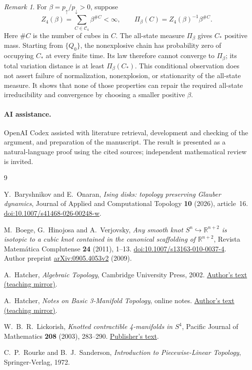 \documentclass[11pt]{article}
\theoremstyle{remark}
\newtheorem{remark}[theorem]{Remark}
\newcommand{\Cl}{\mathcal C}
\newcommand{\R}{\mathbb R}
\begin{document}
\begin{remark}\label{rem:law}
For $\beta=p_\uparrow/p_\downarrow>0$, suppose
\[
 Z_4(\beta)=\sum_{C\in\Cl_4}\beta^{\#C}<\infty,
 \qquad \Pi_\beta(C)=Z_4(\beta)^{-1}\beta^{\#C}.
\]
Here $\#C$ is the number of cubes in $C$. The all-state measure
$\Pi_\beta$ gives $C_*$ positive mass. Starting from $\{Q_0\}$, the
nonexplosive chain has probability zero of occupying $C_*$ at every
finite time. Its law therefore cannot converge to $\Pi_\beta$; its
total variation distance is at least $\Pi_\beta(C_*)$.
This conditional observation does not assert failure of normalization,
nonexplosion, or stationarity of the all-state measure. It shows that
none of those properties can repair the required all-state irreducibility
and convergence by choosing a smaller positive $\beta$.
\end{remark}

\paragraph{AI assistance.}
OpenAI Codex assisted with literature retrieval, development and checking
of the argument, and preparation of the manuscript. The result is
presented as a natural-language proof using the cited sources; independent
mathematical review is invited.

\clearpage
\begin{thebibliography}{9}

Y.~Baryshnikov and E.~Onaran,
\emph{Ising disks: topology preserving Glauber dynamics},
Journal of Applied and Computational Topology \textbf{10} (2026), article~16.
\href{https://doi.org/10.1007/s41468-026-00248-w}{doi:10.1007/s41468-026-00248-w}.

M.~Boege, G.~Hinojosa and A.~Verjovsky,
\emph{Any smooth knot $S^n\hookrightarrow\R^{n+2}$ is isotopic to a cubic knot
contained in the canonical scaffolding of $\R^{n+2}$},
Revista Matem\'atica Complutense \textbf{24} (2011), 1--13.
\href{https://doi.org/10.1007/s13163-010-0037-4}{doi:10.1007/s13163-010-0037-4}.
Author preprint \href{https://arxiv.org/abs/0905.4053v2}{arXiv:0905.4053v2}
(2009).

A.~Hatcher, \emph{Algebraic Topology}, Cambridge University Press, 2002.
\href{https://math.uchicago.edu/~farb/algtop2023/Hatcher.pdf}{Author's text (teaching mirror)}.

A.~Hatcher, \emph{Notes on Basic 3-Manifold Topology}, online notes.
\href{https://sschleimer.warwick.ac.uk/Teach/2021_3MFDS/References/2007notes_on_basic_three-manifold_topology.pdf}{Author's text (teaching mirror)}.

W.~B.~R.~Lickorish,
\emph{Knotted contractible 4-manifolds in $S^4$},
Pacific Journal of Mathematics \textbf{208} (2003), 283--290.
\href{https://msp.org/pjm/2003/208-2/pjm-v208-n2-p06-s.pdf}{Publisher's text}.

C.~P.~Rourke and B.~J.~Sanderson,
\emph{Introduction to Piecewise-Linear Topology}, Springer-Verlag, 1972.

\end{thebibliography}
\end{document}
